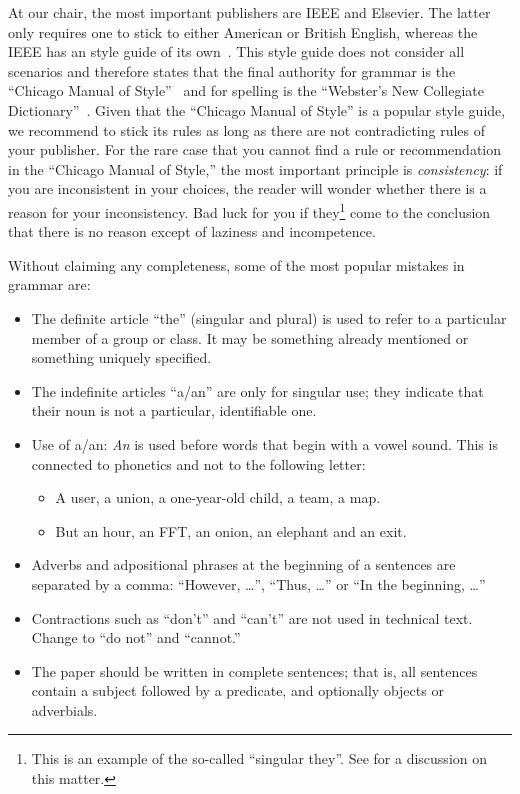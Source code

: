 At our chair, the most important publishers are IEEE and Elsevier. 
The latter only requires one to stick to either American or British English, whereas the IEEE has an style guide of its own~\cite{IEEEStyle}. 
This style guide does not consider all scenarios and therefore states that the final authority for grammar is the ``Chicago Manual of Style''~\cite{_chicago_2017} and for spelling is the ``Webster’s New Collegiate Dictionary''~\cite{merriam-websterinc_merriam_2014}.
Given that the ``Chicago Manual of Style'' is a popular style guide, we recommend to stick its rules as long as there are not contradicting rules of your publisher. 
For the rare case that you cannot find a rule or recommendation in the ``Chicago Manual of Style,'' the most important principle is \emph{consistency}: 
if you are inconsistent in your choices, the reader will wonder whether there is a reason for your inconsistency. 
Bad luck for you if they\footnote{This is an example of the so-called ``singular they''. See \cite{_chicago_2017} for a discussion on this matter.} come to the conclusion that there is no reason except of laziness and  incompetence.

Without claiming any completeness, some of the most popular mistakes in grammar are:
\begin{itemize}
    \item The definite article “the” (singular and plural) is used to refer to a particular member of a group or class. 
    It may be something already mentioned or something uniquely specified.
    \item The indefinite articles “a/an” are only for singular use; 
    they indicate that their noun is not a particular, identifiable one. 
    \item Use of a/an: \emph{An} is used before words that begin with a vowel sound. 
    This is connected to phonetics and not to the following letter:
    \begin{itemize}\vspace*{-0.1cm}
        \item A user, a union, a one-year-old child, a team, a map.
        \item But an hour, an FFT, an onion, an elephant and an exit.
    \end{itemize}
    \item Adverbs and adpositional phrases at the beginning of a sentences are 
    separated by a comma: “However, \ldots”,  “Thus, \ldots” or “In the beginning, \ldots”
    \item Contractions such as “don’t” and “can’t” are not used in technical text. 
    Change to “do not” and “cannot.”
    \item The paper should be written in complete sentences; that is,  all sentences
    contain a subject followed by a predicate, and optionally objects or adverbials.
\end{itemize}
\clearpage

